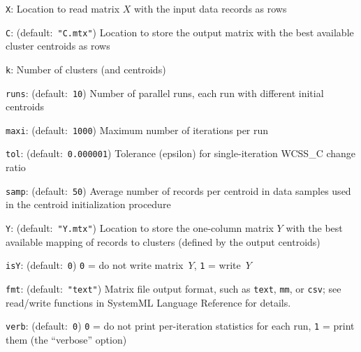 \smallskip
{}
\begin{Description}
\item[{\tt X}:]
Location to read matrix $X$ with the input data records as rows
\item[{\tt C}:] (default:\mbox{ }{\tt "C.mtx"})
Location to store the output matrix with the best available cluster centroids as rows
\item[{\tt k}:]
Number of clusters (and centroids)
\item[{\tt runs}:] (default:\mbox{ }{\tt 10})
Number of parallel runs, each run with different initial centroids
\item[{\tt maxi}:] (default:\mbox{ }{\tt 1000})
Maximum number of iterations per run
\item[{\tt tol}:] (default:\mbox{ }{\tt 0.000001})
Tolerance (epsilon) for single-iteration WCSS\_C change ratio
\item[{\tt samp}:] (default:\mbox{ }{\tt 50})
Average number of records per centroid in data samples used in the centroid
initialization procedure
\item[{\tt Y}:] (default:\mbox{ }{\tt "Y.mtx"})
Location to store the one-column matrix $Y$ with the best available mapping of
records to clusters (defined by the output centroids)
\item[{\tt isY}:] (default:\mbox{ }{\tt 0})
{\tt 0} = do not write matrix~$Y$,  {\tt 1} = write~$Y$
\item[{\tt fmt}:] (default:\mbox{ }{\tt "text"})
Matrix file output format, such as {\tt text}, {\tt mm}, or {\tt csv};
see read/write functions in SystemML Language Reference for details.
\item[{\tt verb}:] (default:\mbox{ }{\tt 0})
{\tt 0} = do not print per-iteration statistics for each run, {\tt 1} = print them
(the ``verbose'' option)
\end{Description}
\smallskip
{}
